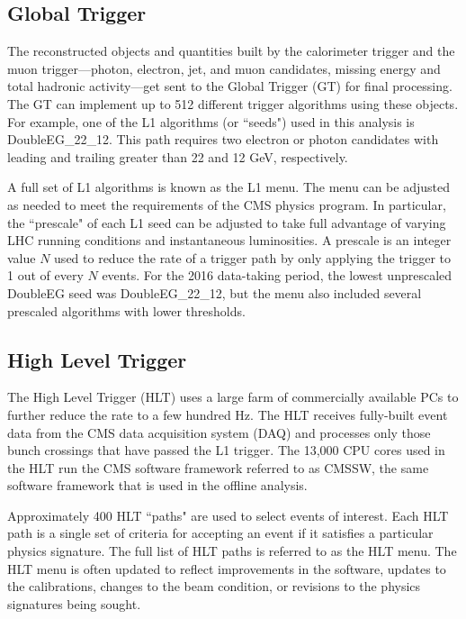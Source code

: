 \subsection{Global Trigger}
The reconstructed objects and quantities built by the calorimeter trigger and the muon trigger---photon, electron, jet, and muon candidates, missing energy and total hadronic activity---get sent to the Global Trigger (GT) for final processing. The GT can implement up to 512 different trigger algorithms using these objects. For example, one of the L1 algorithms (or ``seeds") used in this analysis is DoubleEG\_22\_12.  This path requires two electron or photon candidates with leading and trailing \pT greater than 22 and 12 GeV, respectively.

A full set of L1 algorithms is known as the L1 menu. The menu can be adjusted as needed to meet the requirements of the CMS physics program. 
In particular, the ``prescale" of each L1 seed can be adjusted 
to take full advantage of varying LHC running conditions and instantaneous luminosities. 
A prescale is an integer value $N$ used to reduce the rate of a trigger path by only applying the trigger to
1 out of every $N$ events. For the 2016 data-taking period, the lowest unprescaled DoubleEG seed was
DoubleEG\_22\_12, but the menu also included several prescaled algorithms with lower \pT thresholds.


\subsection{High Level Trigger}
\label{HLT}
The High Level Trigger (HLT) uses a large farm of commercially available PCs to further reduce the rate to a few hundred Hz. The HLT receives fully-built event data from the CMS data acquisition system (DAQ) and processes only those bunch crossings that have passed the L1 trigger. The 13,000 CPU cores used in the HLT run the CMS software framework referred to as CMSSW, the same software framework that is used in the offline analysis. 

Approximately 400 HLT ``paths" are used to select events of interest. Each HLT path is a single set of criteria for accepting an event if it satisfies a particular physics signature. The full list of HLT paths is referred to as the HLT menu. The HLT menu is often updated to reflect improvements in the software, updates to the calibrations, changes to the beam condition, or revisions to the physics signatures being sought. 

